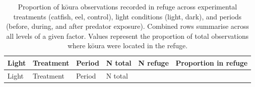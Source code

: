 \documentclass[
  12pt,
  a4paper,
  oneside]{scrbook}
\begin{document}
\begin{longtable}[]{@{}
  >{\raggedright\arraybackslash}p{}
  >{\raggedright\arraybackslash}p{}
  >{\raggedright\arraybackslash}p{}
  >{\raggedleft\arraybackslash}p{}
  >{\raggedleft\arraybackslash}p{}
  >{\raggedleft\arraybackslash}p{}@{}}
\caption{Proportion of kōura observations recorded in refuge across
experimental treatments (catfish, eel, control), light conditions
(light, dark), and periods (before, during, and after predator
exposure). Combined rows summarise across all levels of a given factor.
Values represent the proportion of total observations where kōura were
located in the refuge.}\tabularnewline
\toprule\noalign{}
\begin{minipage}[b]{\linewidth}\raggedright
Light
\end{minipage} & \begin{minipage}[b]{\linewidth}\raggedright
Treatment
\end{minipage} & \begin{minipage}[b]{\linewidth}\raggedright
Period
\end{minipage} & \begin{minipage}[b]{\linewidth}\raggedleft
N total
\end{minipage} & \begin{minipage}[b]{\linewidth}\raggedleft
N refuge
\end{minipage} & \begin{minipage}[b]{\linewidth}\raggedleft
Proportion in refuge
\end{minipage} \\
\midrule\noalign{}
\endfirsthead
\toprule\noalign{}
\begin{minipage}[b]{\linewidth}\raggedright
Light
\end{minipage} & \begin{minipage}[b]{\linewidth}\raggedright
Treatment
\end{minipage} & \begin{minipage}[b]{\linewidth}\raggedright
Period
\end{minipage} & \begin{minipage}[b]{\linewidth}\raggedleft
N total
\end{minipage} & \begin{minipage}[b]{\linewidth}\raggedleft

\end{minipage}
\end{longtable}
\end{document}

